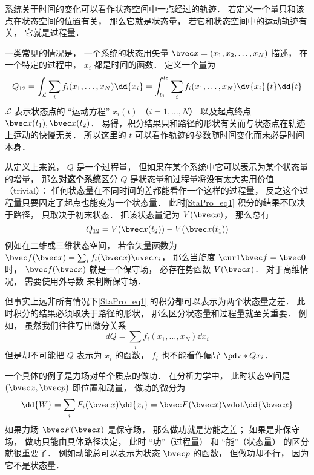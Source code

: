
\begin{issues}
\issueDraft
\end{issues}

系统关于时间的变化可以看作状态空间中一点经过的轨迹． 若定义一个量只和该点在状态空间的位置有关， 那么它就是状态量， 若它和状态空间中的运动轨迹有关， 它就是过程量．

一类常见的情况是， 一个系统的状态用矢量 $\bvec x = (x_1, x_2, \dots, x_N)$ 描述， 在一个特定的过程中， $x_i$ 都是时间的函数． 定义一个量为
\begin{equation}\label{StaPro_eq1}
Q_{12} = \int_{\mathcal L} \sum_i f_i(x_1, \dots, x_N) \dd{x_i} = \int_{t_1}^{t_2} \sum_i f_i(x_1, \dots, x_N) \dv{x_i}{t} \dd{t}
\end{equation}
$\mathcal L$ 表示状态点的 “运动方程” $x_i(t)$ （$i = 1,\dots, N$） 以及起点终点 $\bvec x(t_1), \bvec x(t_2)$． 易得，积分结果只和路径的形状有关而与状态点在轨迹上运动的快慢无关． 所以这里的 $t$ 可以看作轨迹的参数随时间变化而未必是时间本身．

从定义上来说， $Q$ 是一个过程量， 但如果在某个系统中它可以表示为某个状态量的增量， 那么\textbf{对这个系统}区分 $Q$ 是状态量和过程量将没有太大实用价值（trivial）： 任何状态量在不同时间的差都能看作一个这样的过程量， 反之这个过程量只要固定了起点也能变为一个状态量． 此时\autoref{StaPro_eq1} 积分的结果不取决于路径， 只取决于初末状态． 把该状态量记为 $V(\bvec x)$， 那么总有
\begin{equation}
Q_{12} = V(\bvec x(t_2)) - V(\bvec x(t_1))
\end{equation}
例如在二维或三维状态空间， 若令矢量函数为 $\bvec f(\bvec x) = \sum_i f_i(\bvec x) \uvec x_i$， 那么当旋度 $\curl \bvec f = \bvec 0$ 时， $\bvec f(\bvec x)$ 就是一个保守场， 必存在势函数 $V(\bvec x)$． 对于高维情况， 需要使用外导数 来判断保守场．

但事实上远非所有情况下\autoref{StaPro_eq1} 的积分都可以表示为两个状态量之差． 此时积分的结果必须取决于路径的形状， 那么区分状态量和过程量就至关重要． 例如， 虽然我们往往写出微分关系
\begin{equation}
dQ = \sum_i f_i(x_1, \dots, x_N) \dd{x_i}
\end{equation}
但是却不可能把 $Q$ 表示为 $x_i$ 的函数， $f_i$ 也不能看作偏导 $\pdv*{Q}{x_i}$．

一个具体的例子是力场对单个质点的做功． 在分析力学中， 此时状态空间是 $(\bvec x, \bvec p)$ 即位置和动量， 做功的微分为
\begin{equation}
\dd{W} = \sum_i F_i(\bvec x) \dd{x_i} = \bvec F(\bvec x) \vdot \dd{\bvec x}
\end{equation}
如果力场 $\bvec F(\bvec x)$ 是保守场， 那么做功就是势能之差； 如果是非保守场， 做功只能由具体路径决定， 此时 “功”（过程量） 和 “能”（状态量） 的区分就很重要了． 例如动能总可以表示为状态 $\bvec p$ 的函数， 但做功却不行， 因为它不是状态量．

